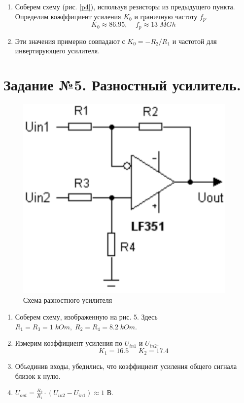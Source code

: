 \documentclass[a4paper]{article}
\begin{document}
\begin{enumerate}
    \item Соберем схему (рис. \ref{p4}), используя резисторы из предыдущего пункта. Определим кожффициент усиления $K_0$ и граничную частоту $f_p$.
    $$K_0 \approx 86.95, \;\;\;\; f_p \approx 13\;MGh$$
    \item Эти значения примерно совпадают с $K_0 = -R_2/R_1$ и частотой для инвертирующего усилителя.
\end{enumerate}


\section{Задание №5. Разностный усилитель. }


\begin{figure}[H]
    \begin{center}
        \includegraphics[scale = 0.5]{задание_5.png}
        \caption{Схема разностного усилителя}
        \label{Sallen-Ki}
    \end{center}
\end{figure}

\begin{enumerate}
    \item Соберем схему, изображенную на рис. 5. Здесь $R_1 = R_3 = 1\; kOm,\; R_2 = R_4 = 8.2\;kOm$.
    \item Измерим коэффициент усиления по $U_{in1} $ и $U_{in2}$. 
    $$K_1 = 16.5\;\;\;\;\;K_2 = 17.4$$


    \item  Объединив входы, убедились, что коэффициент усиления общего сигнала близок к нулю.
    \item $U_{out} = \frac{R_2}{R_1}\cdot(U_{in2} - U_{in1}) \approx 1$ В.

\end{enumerate}
\end{document}
